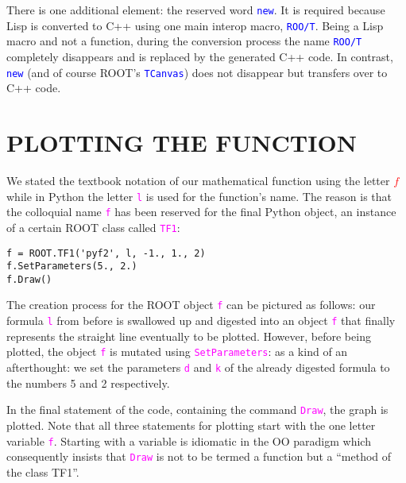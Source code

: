 \documentclass[twocolumn]{article}
\begin{document}
There is one additional element: the reserved word \texttt{\textcolor{blue}{new}}. It is required because Lisp is converted to C++ using one main interop macro, \texttt{\textcolor{blue}{ROO/T}}. Being a Lisp macro and not a function, during the conversion process the name \texttt{\textcolor{blue}{ROO/T}} completely disappears and is replaced by the generated C++ code. In contrast, \texttt{\textcolor{blue}{new}} (and of course ROOT’s \texttt{\textcolor{blue}{TCanvas}}) does not disappear but transfers over to C++ code.

\section{PLOTTING THE FUNCTION}
We stated the textbook notation of our mathematical function using the letter \textcolor{red}{$f$} while in Python the letter \texttt{\textcolor{magenta}{l}} is used for the function's name. The reason is that the colloquial name \texttt{\textcolor{magenta}{f}} has been reserved for the final Python object, an instance of a certain ROOT class called \texttt{\textcolor{magenta}{TF1}}:
{\color{magenta}\begin{verbatim}
f = ROOT.TF1('pyf2', l, -1., 1., 2)
f.SetParameters(5., 2.)
f.Draw()
\end{verbatim}}
The creation process for the ROOT object \texttt{\textcolor{magenta}{f}} can be pictured as follows: our formula \texttt{\textcolor{magenta}{l}} from before is
swallowed up and digested into an object \texttt{\textcolor{magenta}{f}} that finally represents the straight line eventually to be plotted. However, before being plotted, the object \texttt{\textcolor{magenta}{f}} is mutated using \texttt{\textcolor{magenta}{SetParameters}}: as a kind of an afterthought: we set the parameters \texttt{\textcolor{magenta}{d}} and \texttt{\textcolor{magenta}{k}} of the already digested formula to the numbers 5 and 2 respectively.

In the final statement of the code, containing the command \texttt{\textcolor{magenta}{Draw}}, the graph is plotted. Note that all three statements for plotting start with the one letter variable \texttt{\textcolor{magenta}{f}}. Starting with a variable is idiomatic in the OO paradigm which consequently insists that \texttt{\textcolor{magenta}{Draw}} is not to be termed a function but a “method of the class TF1”.
\end{document}
